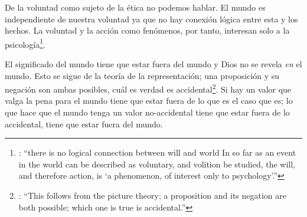 De la voluntad como sujeto de la ética no podemos hablar\autocite[Cf.~][\S6.423]{wittgenstein1922tractatuses}. El mundo es independiente de nuestra voluntad ya que no hay conexión lógica entre esta y los hechos. La voluntad y la acción como fenómenos, por tanto, interesan solo a la psicología\footnote{\cite[cf.~][171]{anscombe1959iwt}: \enquote{there is no logical connection between will and world \textelp{} In so far as an event in the world can be described as voluntary, and volition be studied, the will, and therefore action, is `a phenomenon, of interest only to psychology'.}}.

 El significado del mundo tiene que estar fuera del mundo\autocite[Cf.~][\S6.41]{wittgenstein1922tractatuses} y Dios no se revela \emph{en} el mundo\autocite[Cf.~][\S6.432]{wittgenstein1922tractatuses}. Esto se sigue de la teoría de la representación; una proposición y su negación son ambas posibles, cuál es verdad es accidental\footnote{\cite[Cf.~][170]{anscombe1959iwt}: \enquote{This follows from the picture theory; a proposition and its negation are both possible; which one is true is accidental.}}. Si hay un valor que valga la pena para el mundo tiene que estar fuera de lo que es el caso que es; lo que hace que el mundo tenga un valor no-accidental tiene que estar fuera de lo accidental, tiene que estar fuera del mundo.\autocite[Cf.~][\S6.41]{wittgenstein1922tractatuses}

